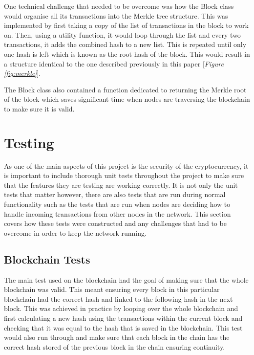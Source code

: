 \documentclass{l4proj}
\begin{document}
One technical challenge that needed to be overcome was how the Block class would organise all its transactions
into the Merkle tree structure. This was implemented by first taking a copy of the list of transactions in the
block to work on. Then, using a utility function, it would loop through the list and every two transactions, it 
adds the combined hash to a new list. This is repeated until only one hash is left which is known as the root 
hash of the block. This would result in a structure identical to the one described previously in this paper
[\textit{Figure \ref{fig:merkle}}].


The Block class also contained a function dedicated to returning the Merkle root of the block which saves 
significant time when nodes are traversing the blockchain to make sure it is valid.

\section{Testing}
As one of the main aspects of this project is the security of the cryptocurrency, it is important to include
thorough unit tests throughout the project to make sure that the features they are testing are working correctly.
It is not only the unit tests that matter however, there are also tests that are run during normal functionality
such as the tests that are run when nodes are deciding how to handle incoming transactions from other nodes in the
network. This section covers how these tests were constructed and any challenges that had to be overcome in order
to keep the network running.

\subsection{Blockchain Tests}
The main test used on the blockchain had the goal of making sure that the whole blockchain was valid. This meant
ensuring every block in this particular blockchain had the correct hash and linked to the following hash in the next block.
This was achieved in practice by looping over the whole blockchain and first calculating a new hash using the 
transactions within the current block and checking that it was equal to the hash that is saved in the 
blockchain. This test would also run through and make sure that each block in the chain has the correct hash
stored of the previous block in the chain ensuring continuity.
\end{document}
